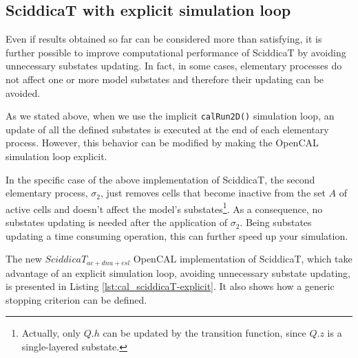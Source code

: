 \subsection{SciddicaT with explicit simulation loop}
Even if results obtained so far can be considered more than
satisfying, it is further possible to improve computational
performance of SciddicaT by avoiding unnecessary substates
updating. In fact, in some cases, elementary processes do not affect
one or more model substates and therefore their updating can be
avoided.

As we stated above, when we use the implicit \verb'calRun2D()'
simulation loop, an update of all the defined substates is executed at
the end of each elementary process. However, this behavior can be
modified by making the OpenCAL simulation loop explicit.

In the specific case of the above implementation of SciddicaT, the
second elementary process, $\sigma_2$, just removes cells that become
inactive from the set $A$ of active cells and doesn't affect the
model's substates\footnote{Actually, only $Q.h$ can be updated by the
  transition function, since $Q.z$ is a single-layered substate.}. As
a consequence, no substates updating is needed after the application
of $\sigma_2$. Being substates updating a time consuming operation,
this can further speed up your simulation.

The new $SciddicaT_{ac+dnu+esl}$ OpenCAL implementation of SciddicaT,
which take advantage of an explicit simulation loop, avoiding
unnecessary substate updating, is presented in Listing
\ref{lst:cal_sciddicaT-explicit}. It also shows how a generic stopping
criterion can be defined.





